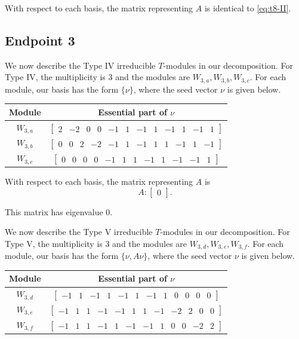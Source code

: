 \documentclass[12pt,letterpaper]{article}
\newcommand{\rowvector}[1]{\begin{bmatrix} #1 \end{bmatrix}}
\begin{document}
With respect to each basis, the matrix representing $A$ is identical to \eqref{eq:t8-II}.

\subsection{Endpoint 3}

We now describe the Type IV irreducible $T$-modules in our decomposition. For Type IV, the multiplicity is 3 and the modules are $W_{3,a} ,W_{3,b}, W_{3,c}$. For each module, our basis has the form $\{\nu\}$, where the seed vector $\nu$ is given below.
\begin{center}
    \begin{tabular}{c | c}
    \toprule
       \textbf{Module}  & \textbf {Essential part of }$\nu$ \\
       \midrule
       $W_{3,a}$  & $\rowvector{2 & -2&0&0&-1&1&-1&1&-1&1&-1&1}$ \\[1.67pt]
       $W_{3,b}$  & $\rowvector{0&0&2&-2&-1&1&-1&1&1&-1&1&-1}$ \\[1.67pt]
       $W_{3,c}$  & $\rowvector{0&0&0&0&-1&1&1&-1&1&-1&-1&1}$ \\
    \bottomrule
    \end{tabular}
\end{center}

With respect to each basis, the matrix representing $A$ is
\begin{equation}
    A: \begin{bmatrix}
  0
\end{bmatrix}. \label{eq:t8-IV}
\end{equation}

This matrix has eigenvalue $0$.

We now describe the Type V irreducible $T$-modules in our decomposition. For Type V, the multiplicity is 3 and the modules are $W_{3,d},W_{3,e}, W_{3,f}$. For each module, our basis has the form $\{\nu, A\nu\}$, where the seed vector $\nu$ is given below.
\begin{center}
    \begin{tabular}{c | c}
    \toprule
       \textbf{Module}  & \textbf {Essential part of }$\nu$ \\
       \midrule
       $W_{3,d}$  & $\rowvector{-1&1&-1&1&-1&1&-1&1&0&0&0&0}$ \\[1.67pt]
       $W_{3,e}$  & $\rowvector{-1&1&1&-1&-1&1&1&-1&-2&2&0&0}$ \\[1.67pt]
       $W_{3,f}$  & $\rowvector{-1&1&1&-1&1&-1&-1&1&0&0&-2&2}$ \\
    \bottomrule
    \end{tabular}
\end{center}
\end{document}
